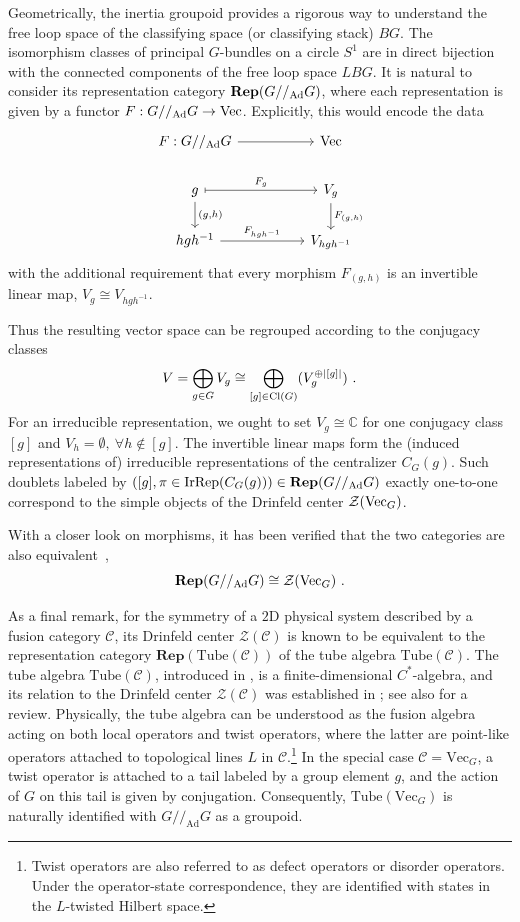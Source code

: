\documentclass[a4paper,11pt]{article}
\newcommand{\Rep}{\textbf{Rep}}
\newcommand{\be}{\begin{equation}}
\newcommand{\ee}{\end{equation}}
\def\bbC{\mathbb{C}}
\def\CZ{\mathcal{Z}}
\def\vecg{{\rm Vec}_G}
\def\gmg{G//_{\rm Ad} G}
\begin{document}
Geometrically, the inertia groupoid provides a rigorous way to understand the free loop space of the classifying space (or classifying stack) $BG$. The isomorphism classes of principal $G$-bundles on a circle $S^1$ are in direct bijection with the connected components of the free loop space $LBG$. 
It is natural to consider its representation category $\Rep(\gmg)$, where each representation is given by a functor $F:\gmg \to {\rm Vec}$. Explicitly, this would encode the data
\be
\begin{tikzcd}
F:\gmg \arrow[rr]             &                    & {\rm Vec}                    \\
g \arrow[rr, "F_g", maps to] \arrow[d, "{(g,h)}"] & & V_g \arrow[d, "{F_{(g,h)}}"] \\
hgh^{-1} \arrow[rr, "F_{hgh^{-1}}"]       &        & V_{hgh^{-1}}                
\end{tikzcd}
\ee
with the additional requirement that every morphism $F_{(g,h)}$ is an invertible linear map, $V_g \cong V_{hgh^{-1}}$. 

Thus the resulting vector space can be regrouped according to the conjugacy classes
\be  V =  \bigoplus_{g\in G} V_g  \cong \bigoplus_{[g]\in {\rm Cl}(G)} (V_g^{\oplus |[g]|} ) \ .  \ee
For an irreducible representation, we ought to set $V_g \cong \bbC$ for one conjugacy class $[g]$ and $V_h = \emptyset ,\ \forall h\notin [g]$. The invertible linear maps form the (induced representations of) irreducible representations of the centralizer $C_G(g)$. Such doublets labeled by $([g],\pi\in\mathrm{IrRep}(C_G(g)))\in \Rep(\gmg)$ exactly one-to-one correspond to the simple objects of the Drinfeld center $\CZ(\vecg)$.

With a closer look on morphisms, it has been verified that the two categories are also equivalent~\cite{Ostrik:2001xnt,Willerton:2008gyk,Ben-Zvi:2008vtm,Fantechi:2001kcr},
\be \Rep(\gmg) \cong \CZ(\vecg) \ .  \ee

As a final remark, for the symmetry of a $2$D physical system described by a fusion category $\mathcal{C}$, its Drinfeld center $\mathcal{Z}(\mathcal{C})$ is known to be equivalent to the representation category $\Rep(\mathrm{Tube}(\mathcal{C}))$ of the tube algebra $\mathrm{Tube}(\mathcal{C})$. The tube algebra $\mathrm{Tube}(\mathcal{C})$, introduced in \cite{ocneanu1994chirality}, is a finite-dimensional $C^*$-algebra, and its relation to the Drinfeld center $\mathcal{Z}(\mathcal{C})$ was established in \cite{evans1995ocneanu,Izumi:2000qa,Muger}; see also \cite{Lin:2022dhv} for a review. Physically, the tube algebra can be understood as the fusion algebra acting on both local operators and twist operators, where the latter are point-like operators attached to topological lines $L$ in $\mathcal{C}$.\footnote{Twist operators are also referred to as defect operators or disorder operators. Under the operator-state correspondence, they are identified with states in the $L$-twisted Hilbert space.} In the special case $\mathcal{C}=\mathrm{Vec}_G$, a twist operator is attached to a tail labeled by a group element $g$, and the action of $G$ on this tail is given by conjugation. Consequently, $\mathrm{Tube}(\mathrm{Vec}_G)$ is naturally identified with $G//_{\text{Ad}}G$ as a groupoid.
\end{document}
